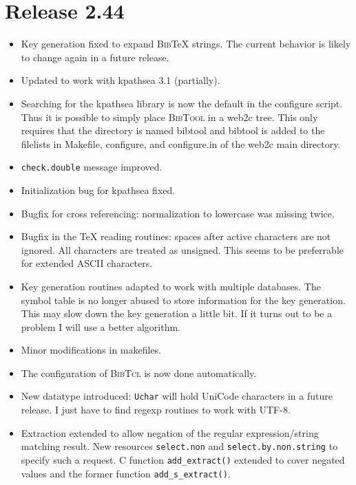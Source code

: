 \documentclass[11pt,a4paper]{scrartcl}
\newcommand\rsc[1]{\texttt{#1}}
\newcommand\BibTool{\textsc{BibTool}}
\newcommand\BibTcl{\textsc{BibTcl}}
\newcommand\BibTeX{\textsc{Bib}\TeX}
\newenvironment{Release}[2]{\section*{Release #1}\begin{itemize}}{\end{itemize}}
\newenvironment{Fix}[1]{\item }{}
\newenvironment{New}[1]{\item }{}
\newenvironment{Update}[1]{\item }{}
\begin{document}
 \begin{Release}{2.44}{April 7 1999}
  \begin{Fix}{gene}
    Key generation fixed to expand \BibTeX{} strings. The current behavior is
    likely to change again in a future release.
  \end{Fix}
  \begin{Update}{gene}
    Updated to work with kpathsea 3.1 (partially).
  \end{Update}
  \begin{New}{gene}
    Searching for the kpathsea library is now the default in the configure
    script. Thus it is possible to simply place \BibTool{} in a web2c tree.
    This only requires that the directory is named bibtool and bibtool is
    added to the filelists in Makefile, configure, and configure.in of the
    web2c main directory.
  \end{New}
  \begin{Fix}{gene}
    \rsc{check.double} message improved.
  \end{Fix}
  \begin{Fix}{gene}
    Initialization bug for kpathsea fixed.
  \end{Fix}
  \begin{Fix}{gene}
    Bugfix for cross referencing: normalization to lowercase was missing
    twice.
  \end{Fix}
  \begin{Fix}{gene}
    Bugfix in the \TeX{} reading routines: spaces after active characters are
    not ignored. All characters are treated as unsigned. This seems to be
    preferrable for extended ASCII characters.
  \end{Fix}
  \begin{Update}{gene}
    Key generation routines adapted to work with multiple databases. The
    symbol table is no longer abused to store information for the key
    generation. This may slow down the key generation a little bit. If it
    turns out to be a problem I will use a better algorithm.
  \end{Update}
  \begin{Update}{gene}
    Minor modifications in makefiles.
  \end{Update}
  \begin{New}{gene}
    The configuration of \BibTcl{} is now done automatically.
  \end{New}
  \begin{New}{gene}
    New datatype introduced: \verb|Uchar| will hold UniCode characters in a
    future release. I just have to find regexp routines to work with UTF-8.
  \end{New}
  \begin{Update}{gene}
    Extraction extended to allow negation of the regular
    expression/string matching result. New resources \rsc{select.non}
    and \rsc{select.by.non.string} to specify such a request. C
    function \verb|add_extract()| extended to cover negated values and
    the former function \verb|add_s_extract()|.
  \end{Update}
 \end{Release}
\end{document}

